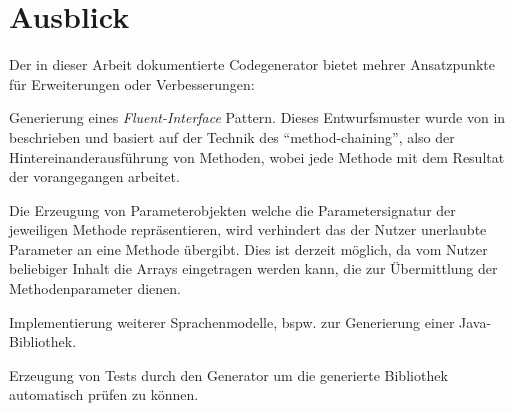 \section{Ausblick}
\label{sec:prospect}


Der in dieser Arbeit dokumentierte Codegenerator bietet mehrer Ansatzpunkte für Erweiterungen oder Verbesserungen:

\begin{compactitem}
    \item Generierung eines \emph{Fluent-Interface} Pattern. Dieses Entwurfsmuster wurde von \citeauthor{fowler2010domain} in \cite{fowler2010domain} beschrieben und basiert auf der Technik des \enquote{method-chaining}, also der Hintereinanderausführung von Methoden, wobei jede Methode mit dem Resultat der vorangegangen arbeitet.
    \item Die Erzeugung von Parameterobjekten welche die Parametersignatur der jeweiligen Methode repräsentieren, wird verhindert das der Nutzer unerlaubte Parameter an eine Methode übergibt. Dies ist derzeit möglich, da vom Nutzer beliebiger Inhalt die Arrays eingetragen werden kann, die zur Übermittlung der Methodenparameter dienen.
    \item Implementierung weiterer Sprachenmodelle, bspw. zur Generierung einer Java-Bibliothek. 
    \item Erzeugung von Tests durch den Generator um die generierte Bibliothek automatisch prüfen zu können.
\end{compactitem}